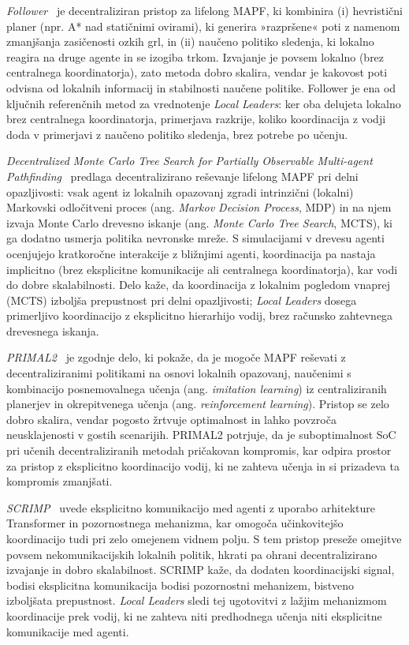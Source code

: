 \documentclass[sigconf,nonacm]{acmart}
\begin{document}
	\textit{Follower}~\cite{andreychuk2024follower} je decentraliziran pristop za lifelong MAPF, ki 
    kombinira (i) hevristični planer (npr. A* nad statičnimi ovirami), ki generira »razpršene« poti z namenom 
    zmanjšanja zasičenosti ozkih grl, in (ii) naučeno politiko sledenja, ki lokalno reagira na druge agente in 
    se izogiba trkom. Izvajanje je povsem lokalno (brez centralnega koordinatorja), zato metoda dobro skalira, 
    vendar je kakovost poti odvisna od lokalnih informacij in stabilnosti naučene politike. 
    Follower je ena od ključnih referenčnih metod za vrednotenje \textit{Local Leaders}: ker oba
    delujeta lokalno brez centralnega koordinatorja, primerjava razkrije, koliko koordinacija z
    vodji doda v primerjavi z naučeno politiko sledenja, brez potrebe po učenju.

	\textit{Decentralized Monte Carlo Tree Search for Partially Observable Multi-agent Pathfinding}~\cite{skrynnik2024mcts} 
    predlaga decentralizirano reševanje lifelong MAPF pri delni opazljivosti: vsak agent iz lokalnih opazovanj 
    zgradi intrinzični (lokalni) Markovski odločitveni proces (ang. \textit{Markov Decision Process}, MDP) in na njem izvaja 
    Monte Carlo drevesno iskanje (ang. \textit{Monte Carlo Tree Search}, MCTS), ki ga dodatno usmerja politika nevronske mreže. S simulacijami v 
    drevesu agenti ocenjujejo kratkoročne interakcije z bližnjimi agenti, koordinacija pa nastaja implicitno (brez 
    eksplicitne komunikacije ali centralnega koordinatorja), kar vodi do dobre skalabilnosti. Delo kaže, da koordinacija z lokalnim pogledom vnaprej (MCTS) izboljša prepustnost pri delni
    opazljivosti; \textit{Local Leaders} dosega primerljivo koordinacijo z eksplicitno hierarhijo
    vodij, brez računsko zahtevnega drevesnega iskanja.

	\textit{PRIMAL2}~\cite{damani2021primal2} je zgodnje delo, ki pokaže, da je mogoče MAPF reševati z 
    decentraliziranimi politikami na osnovi lokalnih opazovanj, naučenimi s kombinacijo posnemovalnega učenja
    (ang. \textit{imitation learning}) iz centraliziranih planerjev in okrepitvenega učenja (ang. \textit{reinforcement learning}). Pristop se zelo dobro skalira, vendar pogosto žrtvuje 
    optimalnost in lahko povzroča neusklajenosti v gostih scenarijih. PRIMAL2 potrjuje, da je suboptimalnost SoC pri učenih decentraliziranih metodah pričakovan
    kompromis, kar odpira prostor za pristop z eksplicitno koordinacijo vodij, ki ne zahteva učenja
    in si prizadeva ta kompromis zmanjšati.

	\textit{SCRIMP}~\cite{wang2023scrimp} uvede eksplicitno komunikacijo med agenti z uporabo arhitekture Transformer in 
    pozornostnega mehanizma, kar omogoča učinkovitejšo koordinacijo tudi pri zelo omejenem vidnem polju. S tem pristop 
    preseže omejitve povsem nekomunikacijskih lokalnih politik, hkrati pa ohrani decentralizirano izvajanje in dobro skalabilnost. 
    SCRIMP kaže, da dodaten koordinacijski signal, bodisi eksplicitna komunikacija bodisi pozornostni
    mehanizem, bistveno izboljšata prepustnost. \textit{Local Leaders} sledi tej ugotovitvi z
    lažjim mehanizmom koordinacije prek vodij, ki ne zahteva niti predhodnega učenja niti
    eksplicitne komunikacije med agenti.
\end{document}
